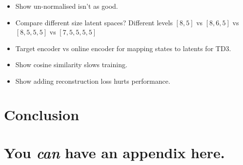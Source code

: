 \documentclass{article}
\theoremstyle{plain}
\theoremstyle{definition}
\theoremstyle{remark}
\begin{document}



\begin{itemize}
  \item Show un-normalised isn't as good.
  \item Compare different size latent spaces? Different levels $[8,5]$ vs $[8,6,5]$ vs $[8,5,5,5]$ vs $[7,5,5,5,5]$
  \item Target encoder vs online encoder for mapping states to latents for TD3.
  \item Show cosine similarity slows training.
  \item Show adding reconstruction loss hurts performance.
\end{itemize}







\section{Conclusion}
\label{conclusion}






\newpage
\appendix
\onecolumn
\section{You \emph{can} have an appendix here.}
\end{document}
